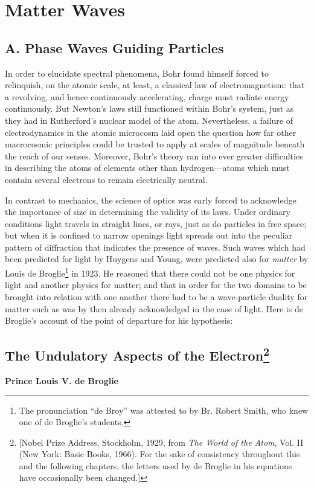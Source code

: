 \chapter{Matter Waves}


\renewcommand{\theequation}{\arabic{equation}}

\section*{A. Phase Waves Guiding Particles}

In order to elucidate spectral phenomena, Bohr found himself forced to
relinquish, on the atomic scale, at least, a classical law of
electromagnetism: that a revolving, and hence continuously accelerating,
charge must radiate energy continuously. But Newton's laws still
functioned within Bohr's system, just as they had in Rutherford's
nuclear model of the atom. Nevertheless, a failure of electrodynamics in
the atomic microcosm laid open the question how far other macrocosmic
principles could be trusted to apply at scales of magnitude beneath the
reach of our senses. Moreover, Bohr's theory ran into ever greater
difficulties in describing the atoms of elements other than
hydrogen---atoms which must contain several electrons to remain
electrically neutral.

In contrast to mechanics, the science of optics was early forced to
acknowledge the importance of size in determining the validity of its
laws. Under ordinary conditions light travels in straight lines, or
rays, just as do particles in free space; but when it is confined to
narrow openings light spreads out into the peculiar pattern of
diffraction that indicates the presence of waves. Such waves which had
been predicted for light by Huygens and Young, were predicted also for
\emph{matter} by Louis de Broglie\footnote{The pronunciation ``de Broy''
  was attested to by Br. Robert Smith, who knew one of de Broglie's
  students.} in 1923. He reasoned that there could not be one physics
for light and another physics for matter; and that in order for the two
domains to be brought into relation with one another there had to be a
wave-particle duality for matter such as was by then already
acknowledged in the case of light. Here is de Broglie's account of the
point of departure for his hypothesis:


\section*{The Undulatory Aspects of the Electron\footnote{{[}Nobel Prize Address,
  Stockholm, 1929, from \emph{The World of the Atom}, Vol. II (New York:
  Basic Books, 1966). For the sake of consistency throughout this and
  the following chapters, the letters used by de Broglie in his
  equations have occasionally been changed.{]}}}
\begin{center}
\textbf{Prince Louis V. de Broglie}
\end{center}

